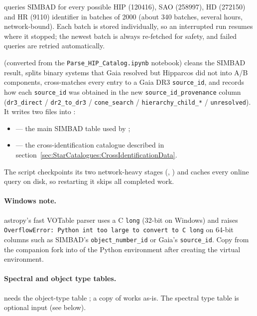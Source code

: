  queries SIMBAD for every possible
HIP (120416), SAO (258997), HD (272150) and HR (9110) identifier in batches
of 2000 (about 340 batches, several hours, network-bound). Each batch is
stored individually, so an interrupted run resumes where it stopped; the
newest batch is always re-fetched for safety, and failed queries are
retried automatically.

 (converted from the
\texttt{Parse\_HIP\_Catalog.ipynb} notebook) cleans the SIMBAD result,
splits binary systems that Gaia resolved but Hipparcos did not into
A/B components, cross-matches every entry to a Gaia DR3
\texttt{source\_id}, and records how each \texttt{source\_id} was
obtained in the new \texttt{source\_id\_provenance} column
(\texttt{dr3\_direct} / \texttt{dr2\_to\_dr3} / \texttt{cone\_search}
/ \texttt{hierarchy\_child\_*} / \texttt{unresolved}). It writes two
files into :

\begin{itemize}
  \item {} --- the main SIMBAD table
        used by ;
  \item {} --- the cross-identification catalogue described
        in section~\ref{sec:StarCatalogues:CrossIdentificationData}.
\end{itemize}

The script checkpoints its two network-heavy stages
(, ) and caches every
online query on disk, so restarting it skips all completed work.

\paragraph{Windows note.} astropy's fast VOTable parser uses a C
\texttt{long} (32-bit on Windows) and raises
\texttt{OverflowError: Python int too large to convert to C long} on
64-bit columns such as SIMBAD's \texttt{object\_number\_id} or Gaia's
\texttt{source\_id}. Copy  from the
companion fork into 
 of the Python environment after
creating the virtual environment.

\paragraph{Spectral and object type tables.}  needs the
object-type table ; a copy of  works as-is. The spectral type table  is optional input
(see  below).
